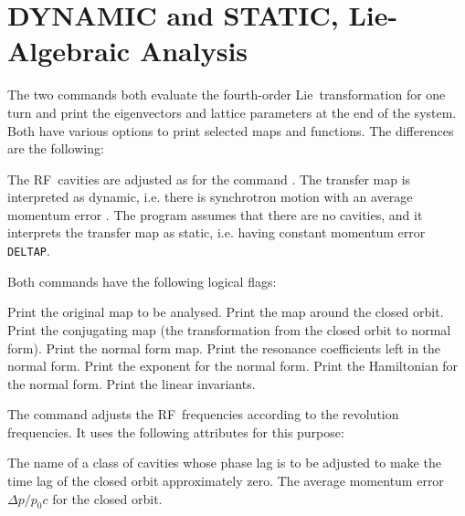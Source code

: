 \section{DYNAMIC and STATIC, Lie-Algebraic Analysis}
\label{S-LIE}
The two commands
both evaluate the fourth-order Lie~transformation for one turn
and print the eigenvectors and lattice parameters at the end
of the system.
Both have various options to print selected maps and functions.
The differences are the following:
\begin{mylist}
The RF~cavities are adjusted as for the command .
The transfer map is interpreted as dynamic, i.e. there is synchrotron
motion with an average momentum error .
The program assumes that there are no cavities,
and it interprets the transfer map as static,
i.e. having constant momentum error {\tt DELTAP}.
\end{mylist}
Both commands have the following logical flags:
\begin{mylist}
Print the original map to be analysed.
Print the map around the closed orbit.
Print the conjugating map
(the transformation from the closed orbit to normal form).
Print the normal form map.
Print the resonance coefficients left in the normal form.
Print the exponent for the normal form.
Print the Hamiltonian for the normal form.
Print the linear invariants.
\end{mylist}
The  command adjusts the RF~frequencies according
to the revolution frequencies.
It uses the following attributes for this purpose:
\begin{mylist}
The name of a class of cavities whose phase lag is to be adjusted
to make the time lag of the closed orbit approximately zero.
The average momentum error \(\Delta p/p_0 c\) for the closed orbit.
\end{mylist}
